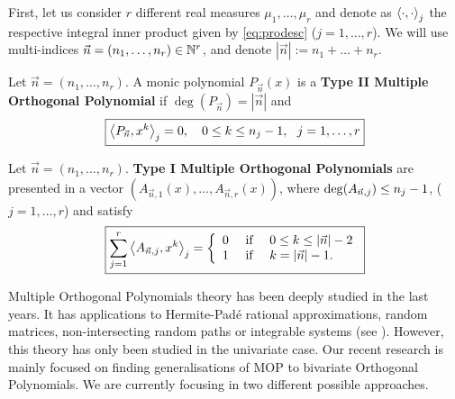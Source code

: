 \documentclass[portrait,final,a0paper,fontscale=0.38]{baposter}
\begin{document}
\begin{poster}
{\begin{multicols}{2}
  First, let us consider $r$ different real measures $\mu_1,\dots,\mu_r$ and denote as $\left\langle \cdot , \cdot \right\rangle_j$ the respective integral inner product given by \eqref{eq:prodesc} ($j=1,\dots,r$). We will use multi-indices $\vec n = (n_1, \dots,n_r)\in \mathbb{N}^r$, and denote $|\vec n| := n_1 + \dots + n_r$. 
    \begin{definition}
      Let $\vec n = (n_1,\dots,n_r)$. A monic polynomial $P_{\vec n}(x)$ is a \textbf{Type II Multiple Orthogonal Polynomial} if $\deg(P_{\vec n})= |\vec n|$ and 
      \begin{equation}
        \label{eq:typeII-MOP-dot}
        \boxed{\left\langle P_{\vec n} , x^k \right\rangle_j = 0, \ \ \ 0\leq k \leq n_{j}-1, \ \ j = 1,\dots,r}
    \end{equation}
  \end{definition}

  \begin{definition}
    \label{def:typeI-univar}
    Let $\vec n = (n_1,\dots,n_r)$. \textbf{Type I Multiple Orthogonal Polynomials} are presented in a vector $(A_{\vec n, 1}(x), \dots, A_{\vec n, r}(x))$, where $\deg(A_{\vec n, j})\leq\nolinebreak n_j-1$, ($j=1,\dots,r$) and satisfy
    \begin{equation}
      \label{eq:typeI-MOP-dot}
      \boxed{\sum_{j=1}^r \left\langle A_{\vec n,j} , x^k \right\rangle_j = \left\{\begin{array}{ccl}
          0 &   \text{ if } & 0\leq k\leq |\vec n|-2 \\
          1 & \text{ if } & k=|\vec n|-1.      
      \end{array}\right.}
    \end{equation}
  \end{definition}

  Multiple Orthogonal Polynomials theory has been deeply studied in the last years. It has applications to Hermite-Padé rational approximations, random matrices, non-intersecting random paths or integrable systems (see \cite{andrei}). However, this theory has only been studied in the univariate case. Our recent research is mainly focused on finding generalisations of MOP to bivariate Orthogonal Polynomials. We are currently focusing in two different possible approaches.  
  
  \end{multicols}
	}
%
%


\end{poster}
\end{document}
